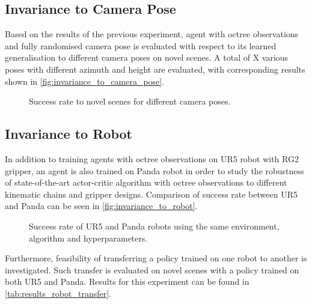 \subsection{Invariance to Camera Pose}

Based on the results of the previous experiment, agent with octree observations and fully randomised camera pose is evaluated with respect to its learned generalisation to different camera poses on novel scenes. A total of X various poses with different azimuth and height are evaluated, with corresponding results shown in \autoref{fig:invariance_to_camera_pose}.

\begin{figure}[ht]
    \centering
    \caption{Success rate to novel scenes for different camera poses.}
    \label{fig:invariance_to_camera_pose}
\end{figure}


\subsection{Invariance to Robot}

In addition to training agents with octree observations on UR5 robot with RG2 gripper, an agent is also trained on Panda robot in order to study the robustness of state-of-the-art actor-critic algorithm with octree observations to different kinematic chains and gripper designs. Comparison of success rate between UR5 and Panda can be seen in \autoref{fig:invariance_to_robot}.

\begin{figure}[ht]
    \centering
    \caption{Success rate of UR5 and Panda robots using the same environment, algorithm and hyperparameters.}
    \label{fig:invariance_to_robot}
\end{figure}

Furthermore, feasibility of transferring a policy trained on one robot to another is investigated. Such transfer is evaluated on novel scenes with a policy trained on both UR5 and Panda. Results for this experiment can be found in \autoref{tab:results_robot_transfer}.

